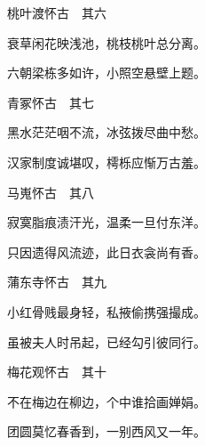 \begin{poem}
    \begin{pl}桃叶渡怀古　其六
    \end{pl}
    \begin{pl}衰草闲花映浅池，桃枝桃叶总分离。
    \end{pl}
    \begin{pl}六朝梁栋多如许，小照空悬壁上题。
    \end{pl}
    \emptypl
    \begin{pl}青冢怀古　其七
    \end{pl}
    \begin{pl}黑水茫茫咽不流，冰弦拨尽曲中愁。
    \end{pl}
    \begin{pl}汉家制度诚堪叹，樗栎应惭万古羞。
    \end{pl}
    \emptypl

    \begin{pl}马嵬怀古　其八
    \end{pl}
    \begin{pl}寂寞脂痕渍汗光，温柔一旦付东洋。
    \end{pl}
    \begin{pl}只因遗得风流迹，此日衣衾尚有香。
    \end{pl}
    \emptypl
    \begin{pl}蒲东寺怀古　其九
    \end{pl}
    \begin{pl}小红骨贱最身轻，私掖偷携强撮成。
    \end{pl}
    \begin{pl}虽被夫人时吊起，已经勾引彼同行。
    \end{pl}
    \emptypl
    \begin{pl}梅花观怀古　其十
    \end{pl}
    \begin{pl}不在梅边在柳边，个中谁拾画婵娟。
    \end{pl}
    \begin{pl}团圆莫忆春香到，一别西风又一年。
    \end{pl}
\end{poem}


